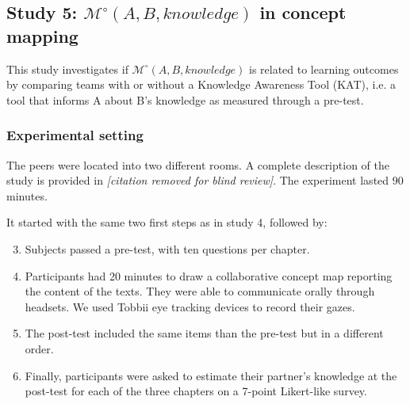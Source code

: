 \documentclass[natbib]{svjour3}
\newcommand{\ie}{i.e.\xspace}
\newcommand{\A}{A\xspace}
\newcommand{\B}{B\xspace}
\newcommand{\Model}[3]{{$\mathcal{M}^{\circ}(#1, #2, #3)$}}
\begin{document}
\subsection{{\bf Study 5}: \Model{A}{B}{knowledge} in concept mapping}

This study investigates if \Model{A}{B}{knowledge} is related to learning
outcomes by comparing teams with or without a Knowledge Awareness Tool (KAT),
\ie a tool that informs \A about \B's knowledge as measured through a pre-test.

\subsubsection*{Experimental setting}

The peers were located into two different rooms. A complete description of the
study is provided in \textit{[citation removed for blind review]}. The experiment lasted 90 minutes.

It started with the same two first steps as in study 4, followed by:

\begin{enumerate}
    \setcounter{enumi}{2}

    \item Subjects passed a pre-test, with ten questions per chapter. 

    \item Participants had 20 minutes to draw a collaborative concept map
        reporting the content of the texts. They were able to communicate
        orally through headsets.  We used Tobbii eye tracking devices to
        record their gazes.

    \item The post-test included the same items than the pre-test but in a
        different order. 

    \item  Finally, participants were asked to estimate their partner's
        knowledge at the post-test for each of the three chapters on a 7-point
        Likert-like survey. 

\end{enumerate}
\end{document}
